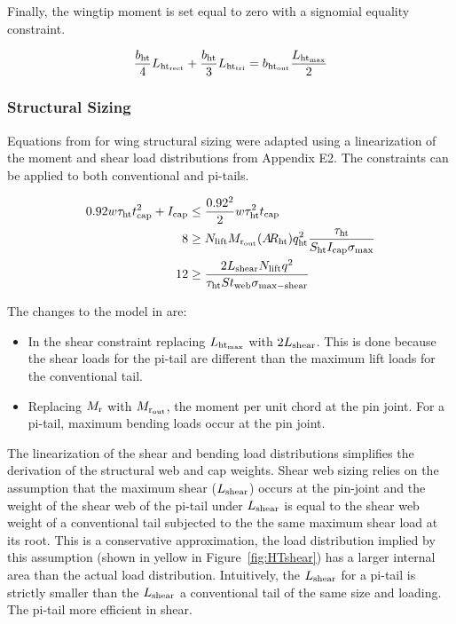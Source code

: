 Finally, the wingtip moment is set equal to zero with a signomial equality 
constraint.

\begin{equation}
    \frac{b_{\rm{ht}}}{4} L_{\rm{ht}_{\rm{rect}}} + \frac{b_{\rm{ht}}}{3} L_{\rm{ht}_{\rm{\rm{tri}}}} = b_{\rm{ht}_{\rm{out}}} 
\frac{L_{\rm{ht}_{\rm{max}}}}{2}
\end{equation}

\subsubsection{Structural Sizing}

Equations from \cite{gp_ac_design} for wing structural sizing were adapted using 
a linearization of the moment and shear load distributions from Appendix E2. The 
constraints can be applied to both conventional and pi-tails.

\begin{align}
    0.92 w\tau_{\rm{ht}} t_{\rm{cap}}^2 + I_{\rm{cap}} &\leq \frac{0.92^2}{2}w\tau_{\rm{ht}}^2t_{\rm{cap}}\\
    8 &\geq N_{\rm{lift}}M_{\rm{r}_{\rm{out}}}(A\hspace{-2.0pt}R_{\rm{ht}})q_{\rm{ht}}^2\frac{\tau_{\rm{ht}}}{S_{\rm{ht}} I_{\rm{cap}}\sigma_{\rm{max}}}\\
    12 &\geq \frac{2L_{\rm{shear}} N_{\rm{lift}} q^2}{\tau_{\rm{ht}} S t_{\rm{web}} \sigma_{\rm{max-shear}}}
\end{align}

The changes to the model in \cite{gp_ac_design} are:
\begin{itemize}
    \item In the shear constraint replacing $L_{\rm{ht}_{\rm{max}}}$ with $2L_{\rm{shear}}$. 
This is done because the shear loads for the pi-tail are different than the 
maximum lift loads for the conventional tail. 
    \item Replacing $M_{\rm{r}}$ with $M_{\rm{r}_{\rm{out}}}$, the moment per unit chord at the 
pin joint. For a pi-tail, maximum bending loads occur at the pin joint.
\end{itemize}

The linearization of the shear and bending load distributions simplifies the 
derivation of the structural web and cap weights. Shear web sizing relies on the 
assumption that the maximum shear ($L_{\rm{shear}}$) occurs at the pin-joint and the 
weight of the shear web of the pi-tail under $L_{\rm{shear}}$ is equal to the shear 
web weight of a conventional tail subjected to the the same maximum shear load 
at its root. This is a conservative approximation, the load distribution implied 
by this assumption (shown in yellow in Figure~\ref{fig:HTshear}) has a larger 
internal area than the actual load distribution. Intuitively, the $L_{\rm{shear}}$ 
for a pi-tail is strictly smaller than the $L_{\rm{shear}}$ a conventional tail of 
the same size and loading. The pi-tail more efficient in shear.

